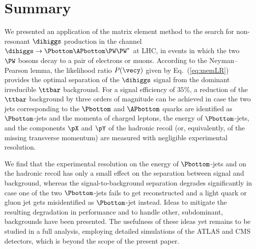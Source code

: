 \section{Summary}
\label{sec:summary}

We presented an application of the matrix element method 
to the search for non-resonant $\dihiggs$ production in the channel $\dihiggs \to \Pbottom\APbottom\PW\PW^{*}$ at LHC,
in events in which the two $\PW$ bosons decay to a pair of electrons or muons.
According to the Neyman–Pearson lemma,
the likelihood ratio $P(\vecy)$ given by Eq.~(\ref{eq:memLR}) provides the optimal separation of the $\dihiggs$ signal from the dominant irreducible $\ttbar$ background.
For a signal efficiency of $35\%$,
a reduction of the $\ttbar$ background by three orders of magnitude can be achieved in case the two jets corresponding to the $\Pbottom$ and $\APbottom$ quarks are identified as $\Pbottom$-jets
and the momenta of charged leptons, the energy of $\Pbottom$-jets, and the components $\pX$ and $\pY$ of the hadronic recoil (or, equivalently, of the missing transverse momentum)
are measured with negligible experimental resolution.

We find that the experimental resolution on the energy of $\Pbottom$-jets and on the hadronic recoil has only a small effect on the separation between signal and background,
whereas the signal-to-background separation degrades significantly in case one of the two $\Pbottom$-jets
fails to get reconstructed and a light quark or gluon jet gets misidentified as $\Pbottom$-jet instead.
Ideas to mitigate the resulting degradation in performance and to handle other, subdominant, backgrounds have been presented.
The usefulness of these ideas yet remains to be studied in a full analysis, employing detailed simulations of the ATLAS and CMS detectors, which is beyond the scope of the present paper.
